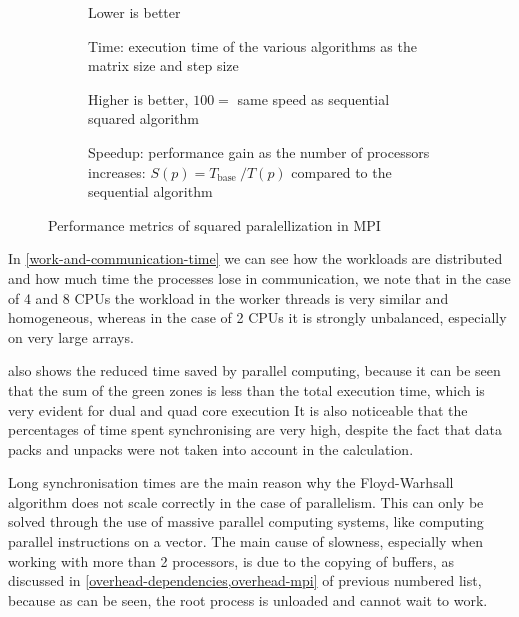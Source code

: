 \begin{figure}[htbp]
    \datatable

    \begin{subfigure}[t]{0.5\textwidth}
                
        \caption*{Lower is better}
        \caption{Time: execution time of the various algorithms as the matrix size and step size}
        \label{time}
    \end{subfigure}
    \begin{subfigure}[t]{0.5\textwidth}
        
        \caption*{Higher is better, \(100 =\) same speed as sequential squared algorithm}
        \caption{Speedup: performance gain as the number of
        processors increases: \( S ( p ) = T _ { \text {base } } / T ( p ) \) compared to the sequential algorithm}
        \label{speedup}
    \end{subfigure}

    \caption{Performance metrics of squared paralellization in MPI}
    \label{performance-metrics}
\end{figure}

In \cref{work-and-communication-time} we can see how the workloads are distributed and how much time the processes lose in communication, we note that in the case of 4 and 8 CPUs the workload in the worker threads is very similar and homogeneous, whereas in the case of 2 CPUs it is strongly unbalanced, especially on very large arrays.

 also shows the reduced time saved by parallel computing, because it can be seen that the sum of the green zones is less than the total execution time, which is very evident for dual and quad core execution It is also noticeable that the percentages of time spent synchronising are very high, despite the fact that data packs and unpacks were not taken into account in the calculation.

Long synchronisation times are the main reason why the Floyd-Warhsall algorithm does not scale correctly in the case of parallelism. This can only be solved through the use of massive parallel computing systems, like computing parallel instructions on a vector.
The main cause of slowness, especially when working with more than 2 processors, is due to the copying of buffers, as discussed in \cref{overhead-dependencies,overhead-mpi} of previous numbered list, because as can be seen, the root process is unloaded and cannot wait to work.

